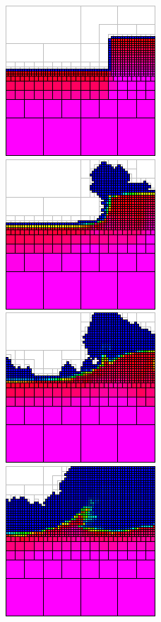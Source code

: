 \begin{frame}
\begin{figure}
{\includegraphics[width=\screenshotwidth]{Images/Screenshots/water_coefficient/Report-figure10}\ \ 
\includegraphics[width=\screenshotwidth]{Images/Screenshots/water_coefficient/Report-figure11}\ \ 
\includegraphics[width=\screenshotwidth]{Images/Screenshots/water_coefficient/Report-figure12}\ \ 
\includegraphics[width=\screenshotwidth]{Images/Screenshots/water_coefficient/Report-figure13}
}
\end{figure}
\end{frame}

